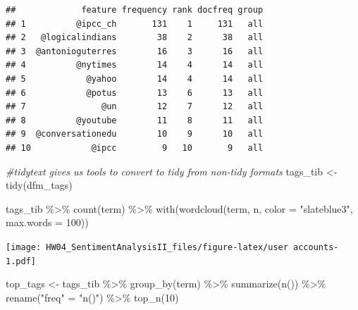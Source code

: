 \documentclass[
]{article}
\newenvironment{Shaded}{\begin{snugshade}}{\end{snugshade}}
\newcommand{\AttributeTok}[1]{\textcolor[rgb]{0.77,0.63,0.00}{#1}}
\newcommand{\CommentTok}[1]{\textcolor[rgb]{0.56,0.35,0.01}{\textit{#1}}}
\newcommand{\DecValTok}[1]{\textcolor[rgb]{0.00,0.00,0.81}{#1}}
\newcommand{\FunctionTok}[1]{\textcolor[rgb]{0.00,0.00,0.00}{#1}}
\newcommand{\NormalTok}[1]{#1}
\newcommand{\OtherTok}[1]{\textcolor[rgb]{0.56,0.35,0.01}{#1}}
\newcommand{\SpecialCharTok}[1]{\textcolor[rgb]{0.00,0.00,0.00}{#1}}
\newcommand{\StringTok}[1]{\textcolor[rgb]{0.31,0.60,0.02}{#1}}
\begin{document}
\begin{verbatim}
##             feature frequency rank docfreq group
## 1          @ipcc_ch       131    1     131   all
## 2   @logicalindians        38    2      38   all
## 3  @antonioguterres        16    3      16   all
## 4          @nytimes        14    4      14   all
## 5            @yahoo        14    4      14   all
## 6            @potus        13    6      13   all
## 7               @un        12    7      12   all
## 8          @youtube        11    8      11   all
## 9  @conversationedu        10    9      10   all
## 10            @ipcc         9   10       9   all
\end{verbatim}

\begin{Shaded}
\begin{Highlighting}[]
\CommentTok{\#tidytext gives us tools to convert to tidy from non{-}tidy formats}
\NormalTok{tags\_tib }\OtherTok{\textless{}{-}} \FunctionTok{tidy}\NormalTok{(dfm\_tags)}

\NormalTok{tags\_tib }\SpecialCharTok{\%\textgreater{}\%}
   \FunctionTok{count}\NormalTok{(term) }\SpecialCharTok{\%\textgreater{}\%}
   \FunctionTok{with}\NormalTok{(}\FunctionTok{wordcloud}\NormalTok{(term, n, }\AttributeTok{color =} \StringTok{"slateblue3"}\NormalTok{, }\AttributeTok{max.words =} \DecValTok{100}\NormalTok{))}
\end{Highlighting}
\end{Shaded}

\texttt{[image: HW04\_SentimentAnalysisII\_files/figure-latex/user accounts-1.pdf]}

\begin{Shaded}
\begin{Highlighting}[]
\NormalTok{top\_tags }\OtherTok{\textless{}{-}}\NormalTok{ tags\_tib }\SpecialCharTok{\%\textgreater{}\%} 
  \FunctionTok{group\_by}\NormalTok{(term) }\SpecialCharTok{\%\textgreater{}\%} 
  \FunctionTok{summarize}\NormalTok{(}\FunctionTok{n}\NormalTok{()) }\SpecialCharTok{\%\textgreater{}\%} 
  \FunctionTok{rename}\NormalTok{(}\StringTok{"freq"} \OtherTok{=} \StringTok{"n()"}\NormalTok{) }\SpecialCharTok{\%\textgreater{}\%} 
  \FunctionTok{top\_n}\NormalTok{(}\DecValTok{10}\NormalTok{) }
\end{Highlighting}
\end{Shaded}
\end{document}
